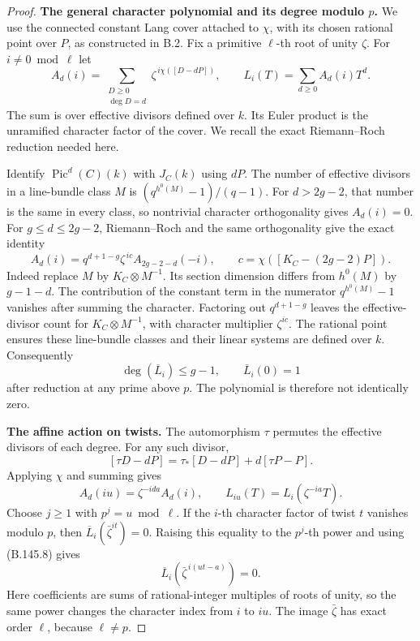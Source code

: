 \begin{proof}
\medskip\noindent\textbf{The general character polynomial and its degree modulo $p$.}
We use the connected constant Lang cover attached to $\chi$,
with its chosen rational point over $P$, as constructed in B.2.
Fix a primitive $\ell$-th root of unity $\zeta$.
For $i\ne0\bmod\ell$ let
\[
 A_d(i)=\sum_{\substack{D\ge0\\ \deg D=d}}
              \zeta^{\,i\chi([D-dP])},\qquad
                 L_i(T)=\sum_{d\ge0}A_d(i)T^d .
                                                            \tag{B.145.5}
\]
The sum is over effective divisors defined over $k$.
Its Euler product is the unramified character factor of the cover.
We recall the exact Riemann--Roch reduction needed here.

Identify $\operatorname{Pic}^d(C)(k)$ with $J_C(k)$ using $dP$.
The number of effective divisors in a line-bundle class $M$
is $(q^{h^0(M)}-1)/(q-1)$.
For $d>2g-2$, that number is the same in every class, so
nontrivial character orthogonality gives $A_d(i)=0$.
For $g\le d\le2g-2$, Riemann--Roch and the same orthogonality
give the exact identity
\[
 A_d(i)=q^{d+1-g}\zeta^{\,i c}
                      A_{2g-2-d}(-i),\qquad
             c=\chi([K_C-(2g-2)P]).
                                                            \tag{B.145.6}
\]
Indeed replace $M$ by $K_C\otimes M^{-1}$.
Its section dimension differs from $h^0(M)$ by $g-1-d$.
The contribution of the constant term in the numerator
$q^{h^0(M)}-1$ vanishes after summing the character.
Factoring out $q^{d+1-g}$ leaves the effective-divisor count
for $K_C\otimes M^{-1}$, with character multiplier
$\zeta^{ic}$.
The rational point ensures these line-bundle classes and their
linear systems are defined over $k$.
Consequently
\[
                   \deg(\overline L_i)\le g-1,\qquad
                            \overline L_i(0)=1
                                                            \tag{B.145.7}
\]
after reduction at any prime above $p$.
The polynomial is therefore not identically zero.

\medskip\noindent\textbf{The affine action on twists.}
The automorphism $\tau$ permutes the effective divisors of
each degree.  For any such divisor,
\[
 [\tau D-dP]=\tau_*[D-dP]+d[\tau P-P].
\]
Applying $\chi$ and summing gives
\[
                  A_d(iu)=\zeta^{-ida}A_d(i),\qquad
                         L_{iu}(T)=L_i(\zeta^{-ia}T).
                                                            \tag{B.145.8}
\]
Choose $j\ge1$ with $p^j=u\bmod\ell$.
If the $i$-th character factor of twist $t$ vanishes modulo $p$,
then $\overline L_i(\bar\zeta^{it})=0$.
Raising this equality to the $p^j$-th power and using
(B.145.8) gives
\[
              \overline L_i(\bar\zeta^{\,i(ut-a)})=0.
                                                            \tag{B.145.9}
\]
Here coefficients are sums of rational-integer multiples of
roots of unity, so the same power changes the character index
from $i$ to $iu$.
The image $\bar\zeta$ has exact order $\ell$, because
$\ell\ne p$.


\end{proof}
